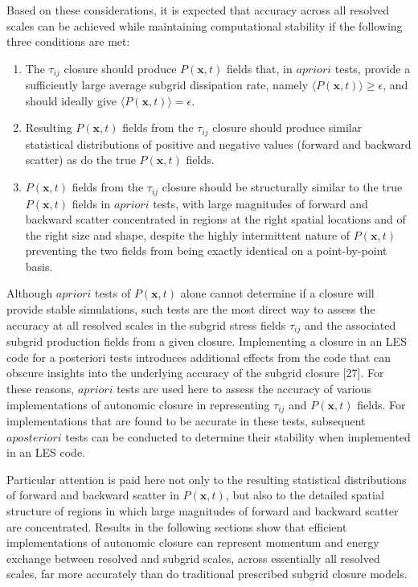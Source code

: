 Based on these considerations, it is expected that accuracy across all resolved scales can be achieved while maintaining computational stability if the following three conditions are met:
%
\begin{enumerate} 
	\item {The  $\tau_{ij}$  closure should produce  $P(\mathbf{x},t)$  fields that, in $a priori$ tests, provide a sufficiently large average subgrid dissipation rate, namely $\langle P(\mathbf{x},t)\rangle \geq \epsilon$, and should ideally give  $\langle P(\mathbf{x},t)\rangle = \epsilon$.}
	\item {Resulting  $P(\mathbf{x},t)$  fields from the   $\tau_{ij}$   closure should produce similar statistical distributions of positive and negative values (forward and backward scatter) as do the true $P(\mathbf{x},t)$  fields.}
	\item {$P(\mathbf{x},t)$  fields from the  $\tau_{ij}$  closure should be structurally similar to the true  $P(\mathbf{x},t)$  fields in   $a priori$   tests, with large magnitudes of forward and backward scatter concentrated in regions at the right spatial locations and of the right size and shape, despite the highly intermittent nature of  $P(\mathbf{x},t)$  preventing the two fields from being exactly identical on a point-by-point basis.}
\end{enumerate}
%
%
Although   $a priori$   tests of  $P(\mathbf{x},t)$  alone cannot determine if a closure will provide stable simulations, such tests are the most direct way to assess the accuracy at all resolved scales in the subgrid stress fields  $\tau_{ij}$   and the associated subgrid production fields   from a given closure. Implementing a closure in an LES code for a posteriori tests introduces additional effects from the code that can obscure insights into the underlying accuracy of the subgrid closure [27]. For these reasons,   $a priori$   tests are used here to assess the accuracy of various implementations of autonomic closure in representing   $\tau_{ij}$   and   $P(\mathbf{x},t)$  fields. For implementations that are found to be accurate in these tests, subsequent   $a posteriori$   tests can be conducted to determine their stability when implemented in an LES code.

Particular attention is paid here not only to the resulting statistical distributions of forward and backward scatter in   $P(\mathbf{x},t)$,   but also to the detailed spatial structure of regions in which large magnitudes of forward and backward scatter are concentrated. Results in the following sections show that efficient implementations of autonomic closure can represent momentum and energy exchange between resolved and subgrid scales, across essentially all resolved scales, far more accurately than do traditional prescribed subgrid closure models. 


